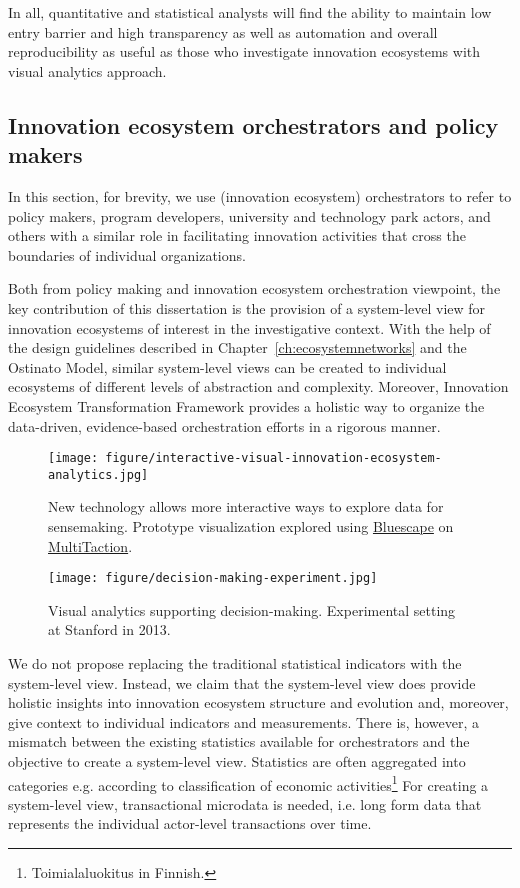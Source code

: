 In all, quantitative and statistical analysts will find the ability to maintain low entry barrier and high transparency as well as automation and overall reproducibility as useful as those who investigate innovation ecosystems with visual analytics approach.

\subsection{Innovation ecosystem orchestrators and policy makers}

In this section, for brevity, we use (innovation ecosystem) orchestrators to refer to policy makers, program developers, university and technology park actors, and others with a similar role in facilitating innovation activities that cross the boundaries of individual organizations.

Both from policy making and innovation ecosystem orchestration viewpoint, the key contribution of this dissertation is the provision of a system-level view for innovation ecosystems of interest in the investigative context. With the help of the design guidelines described in Chapter~\ref{ch:ecosystemnetworks} and the Ostinato Model, similar system-level views can be created to individual ecosystems of different levels of abstraction and complexity. Moreover, Innovation Ecosystem Transformation Framework \citep{Russell2011TransformingOrchestration, Russell2015RelationalEcosystems} provides a holistic way to organize the data-driven, evidence-based orchestration efforts in a rigorous manner.

\begin{figure}[htb]
\centering
\texttt{[image: figure/interactive-visual-innovation-ecosystem-analytics.jpg]}
\caption{New technology allows more interactive ways to explore data for sensemaking. Prototype visualization explored using \href{https://www.bluescape.com/}{Bluescape} on \href{http://www.multitaction.com/}{MultiTaction}.}
\label{fig:interactiveanalytics}
\end{figure}

\begin{figure}[htb]
\centering
\texttt{[image: figure/decision-making-experiment.jpg]}
\caption{Visual analytics supporting decision-making. Experimental setting at Stanford in 2013.}
\label{fig:experiment}
\end{figure}

We do not propose replacing the traditional statistical indicators with the system-level view. Instead, we claim that the system-level view does provide holistic insights into innovation ecosystem structure and evolution and, moreover, give context to individual indicators and measurements. There is, however, a mismatch between the existing statistics available for orchestrators and the objective to create a system-level view. Statistics are often aggregated into categories e.g. according to classification of economic activities\footnote{Toimialaluokitus in Finnish.} For creating a system-level view, transactional microdata is needed, i.e. long form data that represents the individual actor-level transactions over time.

